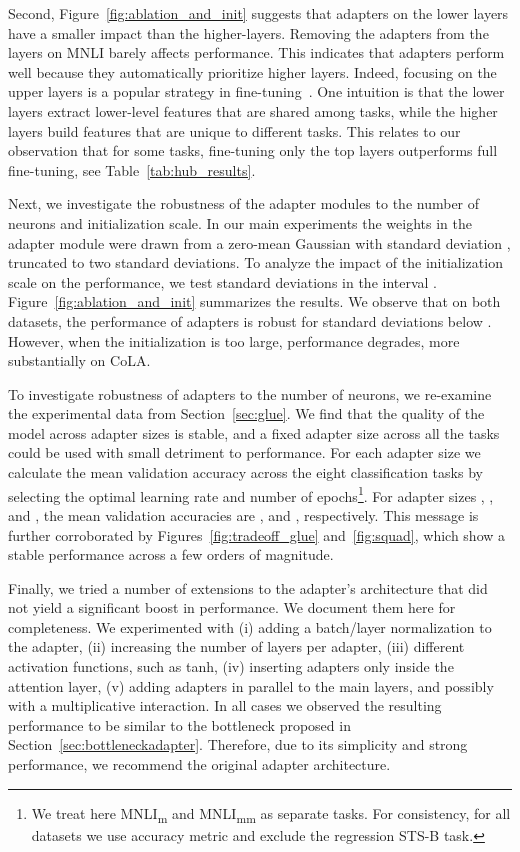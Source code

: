 \documentclass{article}
\begin{document}
Second, Figure~\ref{fig:ablation_and_init} suggests that adapters on the lower layers have a smaller impact than the higher-layers.
Removing the adapters from the layers  on MNLI barely affects performance.
This indicates that adapters perform well because they automatically prioritize higher layers.
Indeed, focusing on the upper layers is a popular strategy in fine-tuning~\citep{howard2018universal}.
One intuition is that the lower layers extract lower-level features that are shared among tasks, while the
higher layers build features that are unique to different tasks.
This relates to our observation that for some tasks, fine-tuning only the top layers outperforms full fine-tuning, see Table~\ref{tab:hub_results}.

Next, we investigate the robustness of the adapter modules to the number of neurons and initialization scale.
In our main experiments the weights in the adapter module were drawn from
a zero-mean Gaussian with standard deviation , truncated to two standard deviations.
To analyze the impact of the initialization scale on the performance, we test standard deviations in the interval .
Figure~\ref{fig:ablation_and_init} summarizes the results.
We observe that on both datasets, the performance of adapters is robust for standard deviations below .
However, when the initialization is too large, performance degrades, more substantially on CoLA.

To investigate robustness of adapters to the number of neurons, we re-examine the experimental data from Section~\ref{sec:glue}.
We find that the quality of the model across adapter sizes is stable,
and a fixed adapter size across all the tasks could be used with small detriment to performance.
For each adapter size we calculate the mean validation accuracy across the eight
classification tasks by selecting the optimal learning rate and number of epochs\footnote{
We treat here MNLI\textsubscript{m} and MNLI\textsubscript{mm} as separate tasks.
For consistency, for all datasets we use accuracy metric and exclude the regression STS-B task.}.
For adapter sizes , , and , the mean validation accuracies are ,  and , respectively.
This message is further corroborated by Figures~\ref{fig:tradeoff_glue} and~\ref{fig:squad},
which show a stable performance across a few orders of magnitude.

Finally, we tried a number of extensions to the adapter's architecture
that did not yield a significant boost in performance.
We document them here for completeness.
We experimented with
(i) adding a batch/layer normalization to the adapter,
(ii) increasing the number of layers per adapter,
(iii) different activation functions, such as tanh,
(iv) inserting adapters only inside the attention layer,
(v) adding adapters in parallel to the main layers, and possibly with a multiplicative interaction.
In all cases we observed the resulting performance to be similar to the bottleneck proposed in Section~\ref{sec:bottleneckadapter}.
Therefore, due to its simplicity and strong performance, we recommend the original adapter architecture.
\end{document}
